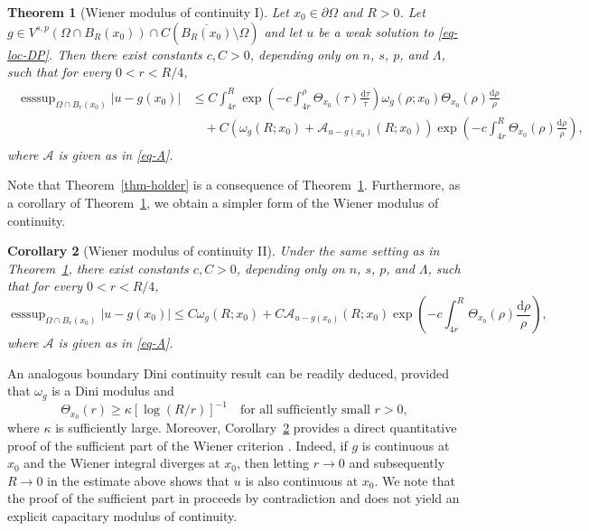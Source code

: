 \documentclass[11pt]{amsart}
\theoremstyle{plain}
\newtheorem{theorem}{Theorem}[section]
\newtheorem{corollary}[theorem]{Corollary}
\theoremstyle{definition}
\numberwithin{equation}{section}
\DeclareMathOperator*{\esssup}{esssup}
\begin{document}
\begin{theorem}[Wiener modulus of continuity I]\label{thm-main}
Let $x_0 \in \partial \Omega$ and $R>0$. Let $g \in V^{s, p}(\Omega \cap B_R(x_0)) \cap C(\overline{B_R(x_0)} \setminus \Omega)$ and let $u$ be a weak solution to \eqref{eq-loc-DP}. Then there exist constants $c, C>0$, depending only on $n$, $s$, $p$, and $\Lambda$, such that for every $0<r<R/4$,
\begin{align}\label{eq-main-modulus}
\begin{split}
\esssup_{\Omega\cap B_r(x_0)}|u-g(x_0)|
&\leq C\int_{4r}^R\exp\left(-c \int_{4r}^{\rho} \Theta_{x_0}(\tau)\frac{\mathrm{d} \tau}{\tau}\right) \omega_g(\rho; x_0)\Theta_{x_0}(\rho)\frac{\mathrm{d}\rho}{\rho}\\
&\quad + C\left(\omega_g(R;x_0)+\mathcal A_{u-g(x_0)}(R;x_0) \right)\exp\left(-c \int_{4r}^R \Theta_{x_0}(\rho)\frac{\mathrm{d} \rho}{\rho}\right),
\end{split}
\end{align}
where $\mathcal{A}$ is given as in \eqref{eq-A}.
\end{theorem}

Note that Theorem~\ref{thm-holder} is a consequence of Theorem~\ref{thm-main}. Furthermore, as a corollary of Theorem~\ref{thm-main}, we obtain a simpler form of the Wiener modulus of continuity.

\begin{corollary}[Wiener modulus of continuity II]\label{cor-main-2}
Under the same setting as in Theorem~\ref{thm-main}, there exist constants $c, C>0$, depending only on $n$, $s$, $p$, and $\Lambda$, such that for every $0<r<R/4$,
\begin{equation*}
        \esssup_{\Omega\cap B_r(x_0)}|u-g(x_0)|
    \leq C \omega_g(R;x_0)+ C\mathcal A_{u-g(x_0)}(R;x_0)
    \exp\left(-c \int_{4r}^R \Theta_{x_0}(\rho)\frac{\mathrm{d} \rho}{\rho}\right),
\end{equation*}
where $\mathcal{A}$ is given as in \eqref{eq-A}.
\end{corollary}


An analogous boundary Dini continuity result can be readily deduced, provided that $\omega_g$ is a Dini modulus and 
\begin{equation*}
    \Theta_{x_0}(r) \geq \kappa [\log(R/r)]^{-1} \quad \text{for all sufficiently small $r>0$},
\end{equation*}
where $\kappa$ is sufficiently large. Moreover, Corollary~\ref{cor-main-2} provides a direct quantitative proof of the sufficient part of the Wiener criterion \cite[Theorem~1.1]{KLL23}. Indeed, if $g$ is continuous at $x_0$ and the Wiener integral diverges at $x_0$, then letting $r\to 0$ and subsequently $R\to 0$ in the estimate above shows that $u$ is also continuous at $x_0$. We note that the proof of the sufficient part in \cite{KLL23} proceeds by contradiction and does not yield an explicit capacitary modulus of continuity.
\end{document}
